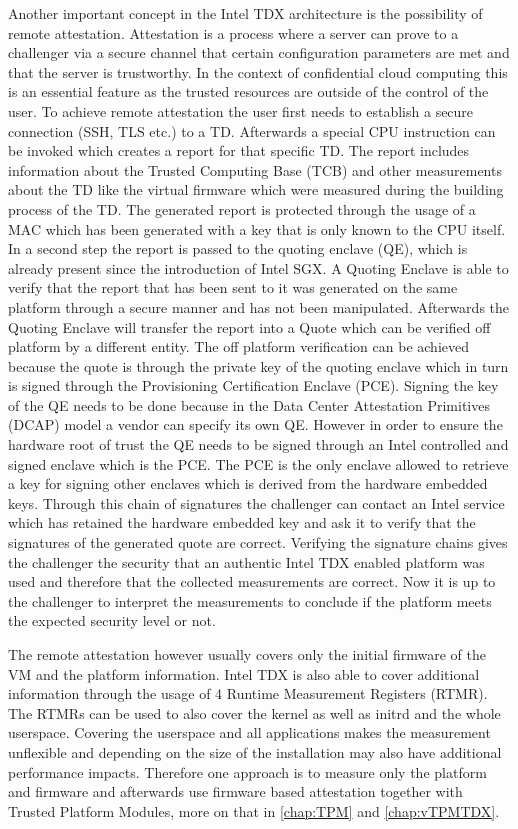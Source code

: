 \documentclass[sigplan,screen,nonacm]{acmart}
\begin{document}
Another important concept in the Intel TDX architecture is the possibility of remote attestation.
Attestation is a process where a server can prove to a challenger via a secure channel that certain configuration parameters are met and that the server is trustworthy.
In the context of confidential cloud computing this is an essential feature as the trusted resources are outside of the control of the user.
To achieve remote attestation the user first needs to establish a secure connection (SSH, TLS etc.) to a TD.
Afterwards a special CPU instruction can be invoked which creates a report for that specific TD.
The report includes information about the Trusted Computing Base (TCB) and other measurements about the TD like the virtual firmware which were measured during the building process of the TD.
The generated report is protected through the usage of a MAC which has been generated with a key that is only known to the CPU itself.
In a second step the report is passed to the quoting enclave (QE), which is already present since the introduction of Intel SGX.
A Quoting Enclave is able to verify that the report that has been sent to it was generated on the same platform through a secure manner and has not been manipulated.
Afterwards the Quoting Enclave will transfer the report into a Quote which can be verified off platform by a different entity.
The off platform verification can be achieved because the quote is through the private key of the quoting enclave which in turn is signed through the Provisioning Certification Enclave (PCE).
Signing the key of the QE needs to be done because in the Data Center Attestation Primitives (DCAP) model a vendor can specify its own QE.
However in order to ensure the hardware root of trust the QE needs to be signed through an Intel controlled and signed enclave which is the PCE.
The PCE is the only enclave allowed to retrieve a key for signing other enclaves which is derived from the hardware embedded keys\cite{Intel-QVL}.
Through this chain of signatures the challenger can contact an Intel service which has retained the hardware embedded key and ask it to verify that the signatures of the generated quote are correct.
Verifying the signature chains gives the challenger the security that an authentic Intel TDX enabled platform was used and therefore that the collected measurements are correct.
Now it is up to the challenger to interpret the measurements to conclude if the platform meets the expected security level or not.

The remote attestation however usually covers only the initial firmware of the VM and the platform information\cite{CA-KVM}.
Intel TDX is also able to cover additional information through the usage of 4 Runtime Measurement Registers (RTMR)\cite{CA-KVM}.
The RTMRs can be used to also cover the kernel as well as initrd and the whole userspace.
Covering the userspace and all applications makes the measurement unflexible and depending on the size of the installation may also have additional performance impacts\cite{CA-KVM}.
Therefore one approach is to measure only the platform and firmware and afterwards use firmware based attestation together with Trusted Platform Modules, more on that in \cref{chap:TPM} and \cref{chap:vTPMTDX}.
\end{document}
